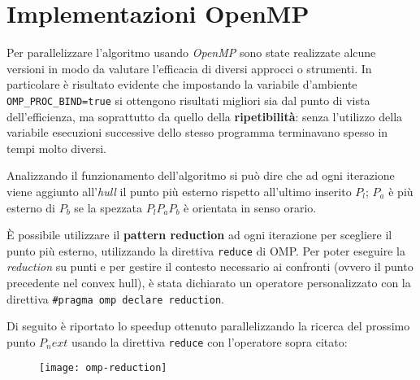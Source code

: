 \section{Implementazioni OpenMP}
Per parallelizzare l'algoritmo usando \emph{OpenMP} sono state realizzate alcune versioni in modo da valutare l'efficacia di diversi approcci o strumenti.
In particolare è risultato evidente che impostando la variabile d'ambiente \texttt{OMP\_PROC\_BIND=true} si ottengono risultati migliori sia dal punto di vista dell'efficienza, ma soprattutto da quello della \textbf{ripetibilità}: senza l'utilizzo della variabile esecuzioni successive dello stesso programma terminavano spesso in tempi molto diversi.

Analizzando il funzionamento dell'algoritmo si può dire che ad ogni iterazione viene aggiunto all'\emph{hull} il punto più esterno rispetto all'ultimo inserito $P_l$;
$P_a$ è più esterno di $P_b$ se la spezzata $P_lP_aP_b$ è orientata in senso orario.

È possibile utilizzare il \textbf{pattern reduction} ad ogni iterazione per scegliere il punto più esterno, utilizzando la direttiva \texttt{reduce} di OMP.  
Per poter eseguire la \emph{reduction} su punti e per gestire il contesto necessario ai confronti (ovvero il punto precedente nel convex hull),
è stata dichiarato un operatore personalizzato con la direttiva \texttt{\#pragma omp declare reduction}.

Di seguito è riportato lo speedup ottenuto parallelizzando la ricerca del prossimo punto $P_next$ usando la direttiva \texttt{reduce} con l'operatore sopra citato:

\begin{figure}[h]
    \texttt{[image: omp-reduction]}
    \centering
\end{figure}
